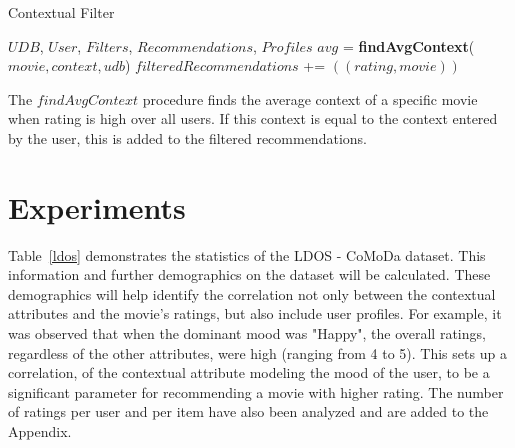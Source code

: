 \documentclass{article}
\begin{document}
\begin{algorithm}[tb]
   \caption{Contextual Filter}
   \label{Contextual Filtering of Collaborative Filtering results}
\begin{algorithmic}
    $UDB$, $User$, $Filters$, $Recommendations$, $Profiles$
   \STATE $avg$ = {\bfseries findAvgContext}($movie, context, udb$)
   \STATE $filteredRecommendations$ += $((rating, movie))$
   \ENDIF   
   \ENDIF
   \ENDFOR
   \ENDIF
   \ENDFOR
\end{algorithmic}
\end{algorithm}

The $findAvgContext$ procedure finds the average context of a specific movie when rating is high over all users. If this context is equal to the context entered by the user, this is added to the filtered recommendations.


\section{Experiments}
Table~\ref{ldos} demonstrates the statistics of the LDOS - CoMoDa dataset. This information and further demographics on the dataset will be calculated. These demographics will help identify the correlation not only between the contextual attributes and the movie's ratings, but also include user profiles. For example, it was observed that when the dominant mood was "Happy", the overall ratings, regardless of the other attributes, were high (ranging from 4 to 5). This sets up a correlation, of the contextual attribute modeling the mood of the user, to be a significant parameter for recommending a movie with higher rating. The number of ratings per user and per item have also been analyzed and are added to the Appendix.
\end{document}
